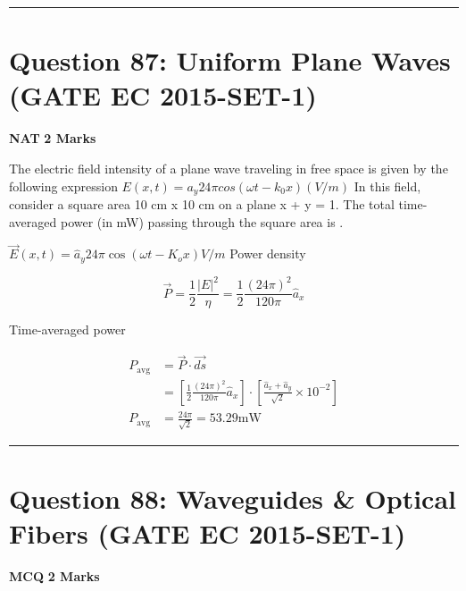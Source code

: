 \documentclass[11pt,a4paper]{article}
\begin{document}
\vspace{1.5em}
\hrule
\vspace{1.5em}

\section*{Question 87: Uniform Plane Waves (GATE EC 2015-SET-1)}
\noindent \textbf{\color{primary}NAT} \hfill \textbf{\color{secondary}2 Marks}


\noindent The electric field intensity of a plane wave traveling in free space is given by the following
expression 
 $E(x,t)=a_{y}24\pi cos(\omega t-k_{0}x)(V/m)$  
 In this field, consider a square area 10 cm x 10 cm on a plane x + y = 1. The total time-averaged power (in mW) passing through the square area is \underline{\hspace{1.5cm}}.


\begin{tcolorbox}[solbox, title=Detailed Solution -- Question 87]
$\vec{E}(x, t)=\hat{a}_{y} 24 \pi \cos \left(\omega t-K_{o} x\right) V / m$
 Power density

\[
\vec{P}=\frac{1}{2} \frac{|E|^{2}}{\eta}=\frac{1}{2} \frac{(24 \pi)^{2}}{120 \pi} \hat{a}_{x}
\]

 Time-averaged power

\[
\begin{aligned} P_{\mathrm{avg}} &=\vec{P} \cdot \overrightarrow{d s} \\ &=\left[\frac{1}{2} \frac{(24 \pi)^{2}}{120 \pi} \hat{a}_{x}\right] \cdot\left[\frac{\hat{a}_{x}+\hat{a}_{y}}{\sqrt{2}} \times 10^{-2}\right] \\ P_{\mathrm{avg}} &=\frac{24 \pi}{\sqrt{2}}=53.29 \mathrm{mW} \end{aligned}
\]
\end{tcolorbox}

\vspace{1.5em}
\hrule
\vspace{1.5em}

\section*{Question 88: Waveguides \& Optical Fibers (GATE EC 2015-SET-1)}
\noindent \textbf{\color{primary}MCQ} \hfill \textbf{\color{secondary}2 Marks}
\end{document}
